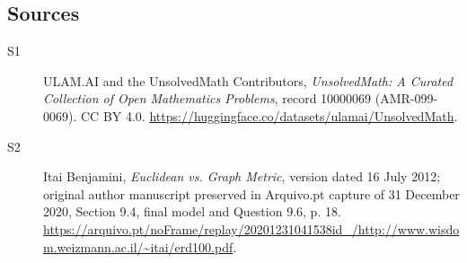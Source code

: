 \documentclass[11pt]{article}
\begin{document}
\subsection{Sources}
\begin{description}
\item[\hypertarget{source:10000069:1}{S1}] ULAM.AI and the UnsolvedMath Contributors, \emph{UnsolvedMath: A Curated Collection of Open Mathematics Problems}, record 10000069 (AMR-099-0069). CC BY 4.0. \url{https://huggingface.co/datasets/ulamai/UnsolvedMath}.
\item[\hypertarget{source:10000069:2}{S2}] Itai Benjamini, \emph{Euclidean vs. Graph Metric}, version dated 16 July 2012; original author manuscript preserved in Arquivo.pt capture of 31 December 2020, Section 9.4, final model and Question 9.6, p. 18. \url{https://arquivo.pt/noFrame/replay/20201231041538id_/http://www.wisdom.weizmann.ac.il/~itai/erd100.pdf}.
\end{description}
\label{end:10000069}
\end{document}
